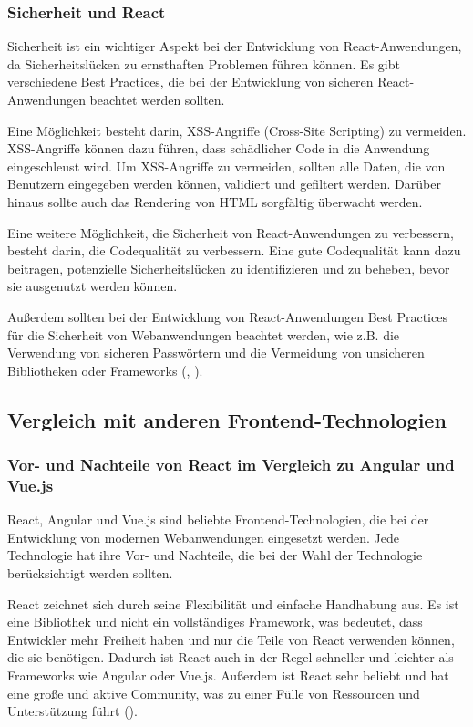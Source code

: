 \subsubsection{Sicherheit und React}
Sicherheit ist ein wichtiger Aspekt bei der Entwicklung von React-Anwendungen, da Sicherheitslücken zu ernsthaften Problemen führen können. Es gibt verschiedene Best Practices, die bei der Entwicklung von sicheren React-Anwendungen beachtet werden sollten.

Eine Möglichkeit besteht darin, XSS-Angriffe (Cross-Site Scripting) zu vermeiden. XSS-Angriffe können dazu führen, dass schädlicher Code in die Anwendung eingeschleust wird. Um XSS-Angriffe zu vermeiden, sollten alle Daten, die von Benutzern eingegeben werden können, validiert und gefiltert werden. Darüber hinaus sollte auch das Rendering von HTML sorgfältig überwacht werden.

Eine weitere Möglichkeit, die Sicherheit von React-Anwendungen zu verbessern, besteht darin, die Codequalität zu verbessern. Eine gute Codequalität kann dazu beitragen, potenzielle Sicherheitslücken zu identifizieren und zu beheben, bevor sie ausgenutzt werden können.

Außerdem sollten bei der Entwicklung von React-Anwendungen Best Practices für die Sicherheit von Webanwendungen beachtet werden, wie z.B. die Verwendung von sicheren Passwörtern und die Vermeidung von unsicheren Bibliotheken oder Frameworks (\cite{ReactSecurity}, \cite{FreeCodeCamp}).

\subsection{Vergleich mit anderen Frontend-Technologien}
\subsubsection{Vor- und Nachteile von React im Vergleich zu Angular und Vue.js}
React, Angular und Vue.js sind beliebte Frontend-Technologien, die bei der Entwicklung von modernen Webanwendungen eingesetzt werden. Jede Technologie hat ihre Vor- und Nachteile, die bei der Wahl der Technologie berücksichtigt werden sollten.

React zeichnet sich durch seine Flexibilität und einfache Handhabung aus. Es ist eine Bibliothek und nicht ein vollständiges Framework, was bedeutet, dass Entwickler mehr Freiheit haben und nur die Teile von React verwenden können, die sie benötigen. Dadurch ist React auch in der Regel schneller und leichter als Frameworks wie Angular oder Vue.js. Außerdem ist React sehr beliebt und hat eine große und aktive Community, was zu einer Fülle von Ressourcen und Unterstützung führt (\cite{Hosttest}).


